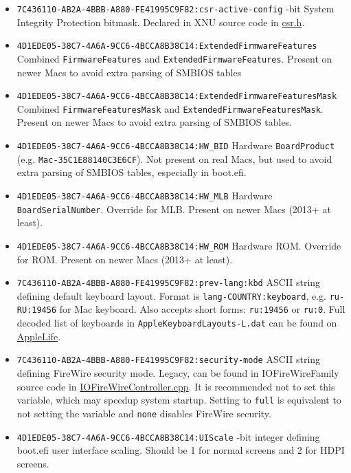 \documentclass[]{article}
\providecommand{\tightlist}{%
  \setlength{\itemsep}{0pt}\setlength{\parskip}{0pt}}
\begin{document}
\begin{itemize}
\tightlist
\item
  \texttt{7C436110-AB2A-4BBB-A880-FE41995C9F82:csr-active-config}
  -bit System Integrity Protection bitmask. Declared in XNU source code in
  \href{https://opensource.apple.com/source/xnu/xnu-4570.71.2/bsd/sys/csr.h.auto.html}{csr.h}.
\item
  \texttt{4D1EDE05-38C7-4A6A-9CC6-4BCCA8B38C14:ExtendedFirmwareFeatures}
  \break
  Combined \texttt{FirmwareFeatures} and \texttt{ExtendedFirmwareFeatures}. Present on
  newer Macs to avoid extra parsing of SMBIOS tables
\item
  \texttt{4D1EDE05-38C7-4A6A-9CC6-4BCCA8B38C14:ExtendedFirmwareFeaturesMask}
  \break
  Combined \texttt{FirmwareFeaturesMask} and \texttt{ExtendedFirmwareFeaturesMask}.
  Present on newer Macs to avoid extra parsing of SMBIOS tables.
\item
  \texttt{4D1EDE05-38C7-4A6A-9CC6-4BCCA8B38C14:HW\_BID}
  \break
  Hardware \texttt{BoardProduct} (e.g. \texttt{Mac-35C1E88140C3E6CF}). Not present on
  real Macs, but used to avoid extra parsing of SMBIOS tables, especially in boot.efi.
\item
  \texttt{4D1EDE05-38C7-4A6A-9CC6-4BCCA8B38C14:HW\_MLB}
  \break
  Hardware \texttt{BoardSerialNumber}. Override for MLB. Present on newer Macs (2013+ at least).
\item
  \texttt{4D1EDE05-38C7-4A6A-9CC6-4BCCA8B38C14:HW\_ROM}
  \break
  Hardware ROM. Override for ROM. Present on newer Macs (2013+ at least).
\item
  \texttt{7C436110-AB2A-4BBB-A880-FE41995C9F82:prev-lang:kbd}
  \break
  ASCII string defining default keyboard layout. Format is \texttt{lang-COUNTRY:keyboard},
  e.g. \texttt{ru-RU:19456} for Mac keyboard. Also accepts short forms: \texttt{ru:19456}
  or \texttt{ru:0}. Full decoded list of keyboards in \texttt{AppleKeyboardLayouts-L.dat}
  can be found on \href{https://www.applelife.ru/posts/763537}{AppleLife}.
\item
  \texttt{7C436110-AB2A-4BBB-A880-FE41995C9F82:security-mode}
  \break
  ASCII string defining FireWire security mode. Legacy, can be found in IOFireWireFamily
  source code in
  \href{https://opensource.apple.com/source/IOFireWireFamily/IOFireWireFamily-473/IOFireWireFamily.kmodproj/IOFireWireController.cpp.auto.html}{IOFireWireController.cpp}.
  It is recommended not to set this variable, which may speedup system startup. Setting to
  \texttt{full} is equivalent to not setting the variable and \texttt{none} disables
  FireWire security.
 \item
  \texttt{4D1EDE05-38C7-4A6A-9CC6-4BCCA8B38C14:UIScale}
  -bit integer defining boot.efi user interface scaling. Should be 1 for normal
  screens and 2 for HDPI screens.
\end{itemize}
\end{document}

